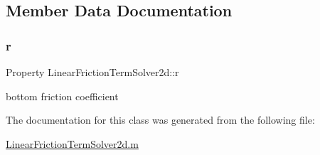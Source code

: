 \subsection{Member Data Documentation}
\mbox{\label{class_linear_friction_term_solver2d_a35d0fab4e33bea9e3b6b7f6e40224aa5}} 
\subsubsection{\texorpdfstring{r}{r}}
{\footnotesize\ttfamily Property Linear\+Friction\+Term\+Solver2d\+::r}



bottom friction coefficient 



The documentation for this class was generated from the following file\+:\begin{DoxyCompactItemize}
\item 
\hyperlink{_linear_friction_term_solver2d_8m}{Linear\+Friction\+Term\+Solver2d.\+m}\end{DoxyCompactItemize}
